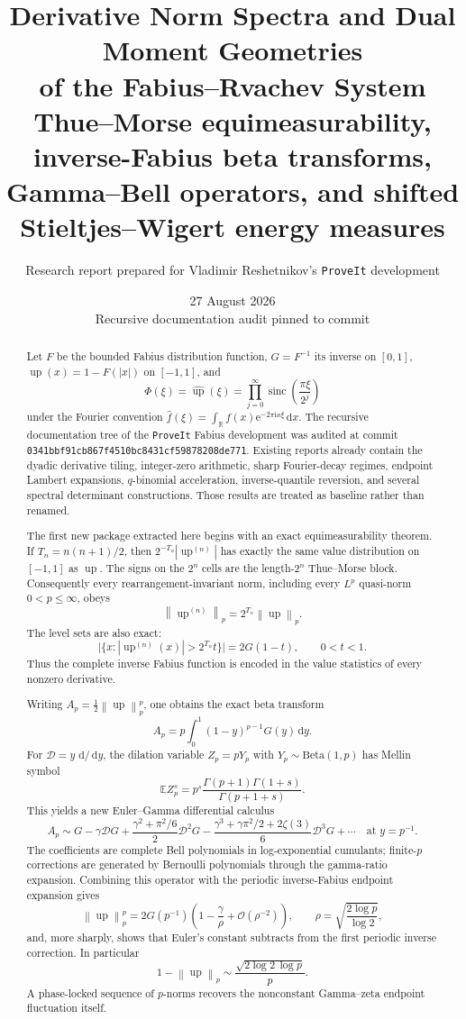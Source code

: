 \documentclass[11pt,oneside]{article}
\title{\bfseries\color{DeepBlue}
Derivative Norm Spectra and Dual Moment Geometries\\[0.25em]
\Large of the Fabius--Rvachev System\\[0.7em]
\large Thue--Morse equimeasurability, inverse-Fabius beta transforms,\\
Gamma--Bell operators, and shifted Stieltjes--Wigert energy measures}
\author{Research report prepared for Vladimir Reshetnikov's \texttt{ProveIt} development}
\date{27 August 2026\\[0.25em]
\small Recursive documentation audit pinned to commit \RepoCommit}
\numberwithin{equation}{section}
\theoremstyle{plain}
\theoremstyle{definition}
\theoremstyle{remark}
\newcommand{\R}{\mathbb R}
\newcommand{\Up}{\operatorname{up}}
\newcommand{\sinc}{\operatorname{sinc}}
\newcommand{\e}{\mathrm e}
\newcommand{\ii}{\mathrm i}
\newcommand{\dd}{\,\mathrm d}
\newcommand{\E}{\mathbb E}
\newcommand{\bigO}{\mathcal O}
\newcommand{\Dop}{\mathscr D}
\newcommand{\abs}[1]{\left|#1\right|}
\newcommand{\norm}[1]{\left\lVert#1\right\rVert}
\newcommand{\RepoCommit}{\nolinkurl{0341bbf91cb867f4510bc8431cf59878208de771}}
\begin{document}
\maketitle

\begin{abstract}
Let $F$ be the bounded Fabius distribution function, $G=F^{-1}$ its inverse on
$[0,1]$, $\Up(x)=1-F(|x|)$ on $[-1,1]$, and
\[
 \Phi(\xi)=\widehat{\Up}(\xi)
 =\prod_{j=0}^{\infty}\sinc\!\left(\frac{\pi\xi}{2^j}\right)
\]
under the Fourier convention
$\widehat f(\xi)=\int_{\R}f(x)\e^{-2\pi\ii x\xi}\dd x$.
The recursive documentation tree of the \texttt{ProveIt} Fabius development was audited at
commit \RepoCommit.  Existing reports already contain the dyadic derivative tiling,
integer-zero arithmetic, sharp Fourier-decay regimes, endpoint Lambert expansions,
$q$-binomial acceleration, inverse-quantile reversion, and several spectral determinant
constructions.  Those results are treated as baseline rather than renamed.

The first new package extracted here begins with an exact equimeasurability theorem.  If
$T_n=n(n+1)/2$, then $2^{-T_n}|\Up^{(n)}|$ has exactly the same value distribution on
$[-1,1]$ as $\Up$.  The signs on the $2^n$ cells are the length-$2^n$ Thue--Morse block.
Consequently every rearrangement-invariant norm, including every $L^p$ quasi-norm
$0<p\leq\infty$, obeys
\[
 \norm{\Up^{(n)}}_p=2^{T_n}\norm{\Up}_p.
\]
The level sets are also exact:
\[
 \bigl|\{x:\abs{\Up^{(n)}(x)}>2^{T_n}t\}\bigr|=2G(1-t),
 \qquad 0<t<1.
\]
Thus the complete inverse Fabius function is encoded in the value statistics of every
nonzero derivative.

Writing
$A_p=\tfrac12\norm{\Up}_p^p$, one obtains the exact beta transform
\[
 A_p=p\int_0^1(1-y)^{p-1}G(y)\dd y.
\]
For $\Dop=y\,\dd/\dd y$, the dilation variable $Z_p=pY_p$ with
$Y_p\sim\mathrm{Beta}(1,p)$ has Mellin symbol
\[
 \E Z_p^s=p^s\frac{\Gamma(p+1)\Gamma(1+s)}{\Gamma(p+1+s)}.
\]
This yields a new Euler--Gamma differential calculus
\[
 A_p\sim
 G-\gamma\Dop G
 +\frac{\gamma^2+\pi^2/6}{2}\Dop^2G
 -\frac{\gamma^3+\gamma\pi^2/2+2\zeta(3)}{6}\Dop^3G+\cdots
 \quad\text{at }y=p^{-1}.
\]
The coefficients are complete Bell polynomials in log-exponential cumulants; finite-$p$
corrections are generated by Bernoulli polynomials through the gamma-ratio expansion.
Combining this operator with the periodic inverse-Fabius endpoint expansion gives
\[
 \norm{\Up}_p^p
 =2G(p^{-1})\left(1-\frac{\gamma}{\rho}
 +\bigO\!\left(\rho^{-2}\right)\right),
 \qquad
 \rho=\sqrt{\frac{2\log p}{\log2}},
\]
and, more sharply, shows that Euler's constant subtracts from the first periodic inverse
correction.  In particular
\[
 1-\norm{\Up}_p\sim\frac{\sqrt{2\log2\,\log p}}{p}.
\]
A phase-locked sequence of $p$-norms recovers the nonconstant Gamma--zeta endpoint
fluctuation itself.


\end{abstract}
\end{document}
